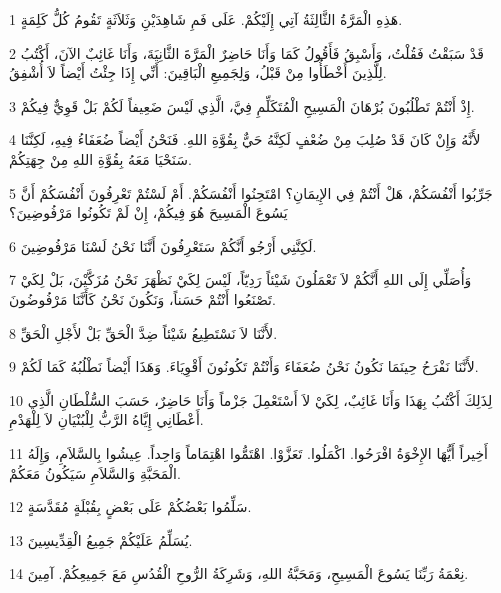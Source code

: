 \par 1 هَذِهِ الْمَرَّةُ الثَّالِثَةُ آتِي إِلَيْكُمْ. عَلَى فَمِ شَاهِدَيْنِ وَثَلاَثَةٍ تَقُومُ كُلُّ كَلِمَةٍ.
\par 2 قَدْ سَبَقْتُ فَقُلْتُ، وَأَسْبِقُ فَأَقُولُ كَمَا وَأَنَا حَاضِرٌ الْمَرَّةَ الثَّانِيَةَ، وَأَنَا غَائِبٌ الآنَ، أَكْتُبُ لِلَّذِينَ أَخْطَأُوا مِنْ قَبْلُ، وَلِجَمِيعِ الْبَاقِينَ: أَنِّي إِذَا جِئْتُ أَيْضاً لاَ أُشْفِقُ.
\par 3 إِذْ أَنْتُمْ تَطْلُبُونَ بُرْهَانَ الْمَسِيحِ الْمُتَكَلِّمِ فِيَّ، الَّذِي لَيْسَ ضَعِيفاً لَكُمْ بَلْ قَوِيٌّ فِيكُمْ.
\par 4 لأَنَّهُ وَإِنْ كَانَ قَدْ صُلِبَ مِنْ ضُعْفٍ لَكِنَّهُ حَيٌّ بِقُوَّةِ اللهِ. فَنَحْنُ أَيْضاً ضُعَفَاءُ فِيهِ، لَكِنَّنَا سَنَحْيَا مَعَهُ بِقُوَّةِ اللهِ مِنْ جِهَتِكُمْ.
\par 5 جَرِّبُوا أَنْفُسَكُمْ، هَلْ أَنْتُمْ فِي الإِيمَانِ؟ امْتَحِنُوا أَنْفُسَكُمْ. أَمْ لَسْتُمْ تَعْرِفُونَ أَنْفُسَكُمْ أَنَّ يَسُوعَ الْمَسِيحَ هُوَ فِيكُمْ، إِنْ لَمْ تَكُونُوا مَرْفُوضِينَ؟
\par 6 لَكِنَّنِي أَرْجُو أَنَّكُمْ سَتَعْرِفُونَ أَنَّنَا نَحْنُ لَسْنَا مَرْفُوضِينَ.
\par 7 وَأُصَلِّي إِلَى اللهِ أَنَّكُمْ لاَ تَعْمَلُونَ شَيْئاً رَدِيّاً، لَيْسَ لِكَيْ نَظْهَرَ نَحْنُ مُزَكَّيْنَ، بَلْ لِكَيْ تَصْنَعُوا أَنْتُمْ حَسَناً، وَنَكُونَ نَحْنُ كَأَنَّنَا مَرْفُوضُونَ.
\par 8 لأَنَّنَا لاَ نَسْتَطِيعُ شَيْئاً ضِدَّ الْحَقِّ بَلْ لأَجْلِ الْحَقِّ.
\par 9 لأَنَّنَا نَفْرَحُ حِينَمَا نَكُونُ نَحْنُ ضُعَفَاءَ وَأَنْتُمْ تَكُونُونَ أَقْوِيَاءَ. وَهَذَا أَيْضاً نَطْلُبُهُ كَمَا لَكُمْ.
\par 10 لِذَلِكَ أَكْتُبُ بِهَذَا وَأَنَا غَائِبٌ، لِكَيْ لاَ أَسْتَعْمِلَ جَزْماً وَأَنَا حَاضِرٌ، حَسَبَ السُّلْطَانِ الَّذِي أَعْطَانِي إِيَّاهُ الرَّبُّ لِلْبُنْيَانِ لاَ لِلْهَدْمِ.
\par 11 أَخِيراً أَيُّهَا الإِخْوَةُ افْرَحُوا. اكْمَلُوا. تَعَزَّوْا. اهْتَمُّوا اهْتِمَاماً وَاحِداً. عِيشُوا بِالسَّلاَمِ، وَإِلَهُ الْمَحَبَّةِ وَالسَّلاَمِ سَيَكُونُ مَعَكُمْ.
\par 12 سَلِّمُوا بَعْضُكُمْ عَلَى بَعْضٍ بِقُبْلَةٍ مُقَدَّسَةٍ.
\par 13 يُسَلِّمُ عَلَيْكُمْ جَمِيعُ الْقِدِّيسِينَ.
\par 14 نِعْمَةُ رَبِّنَا يَسُوعَ الْمَسِيحِ، وَمَحَبَّةُ اللهِ، وَشَرِكَةُ الرُّوحِ الْقُدُسِ مَعَ جَمِيعِكُمْ. آمِينَ.


